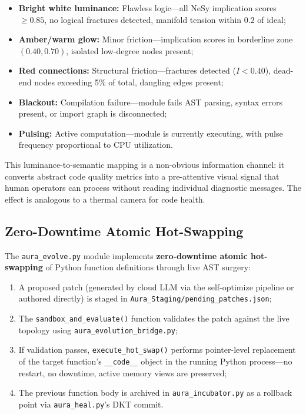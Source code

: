 \documentclass[11pt]{article}
\begin{document}
\begin{itemize}
    \item \textbf{Bright white luminance:} Flawless logic—all NeSy implication scores $\geq 0.85$, no logical fractures detected, manifold tension within $0.2$ of ideal;
    \item \textbf{Amber/warm glow:} Minor friction—implication scores in borderline zone $(0.40, 0.70)$, isolated low-degree nodes present;
    \item \textbf{Red connections:} Structural friction—fractures detected ($I < 0.40$), dead-end nodes exceeding 5\% of total, dangling edges present;
    \item \textbf{Blackout:} Compilation failure—module fails AST parsing, syntax errors present, or import graph is disconnected;
    \item \textbf{Pulsing:} Active computation—module is currently executing, with pulse frequency proportional to CPU utilization.
\end{itemize}

This luminance-to-semantic mapping is a non-obvious information channel: it converts abstract code quality metrics into a pre-attentive visual signal that human operators can process without reading individual diagnostic messages. The effect is analogous to a thermal camera for code health.

\subsection{Zero-Downtime Atomic Hot-Swapping}

The \texttt{aura\_evolve.py} module implements \textbf{zero-downtime atomic hot-swapping} of Python function definitions through live AST surgery:

\begin{enumerate}[label=(\roman*)]
    \item A proposed patch (generated by cloud LLM via the self-optimize pipeline or authored directly) is staged in \texttt{Aura\_Staging/pending\_patches.json};
    \item The \texttt{sandbox\_and\_evaluate()} function validates the patch against the live topology using \texttt{aura\_evolution\_bridge.py};
    \item If validation passes, \texttt{execute\_hot\_swap()} performs pointer-level replacement of the target function's \texttt{\_\_code\_\_} object in the running Python process—no restart, no downtime, active memory views are preserved;
    \item The previous function body is archived in \texttt{aura\_incubator.py} as a rollback point via \texttt{aura\_heal.py}'s DKT commit.
\end{enumerate}
\end{document}

